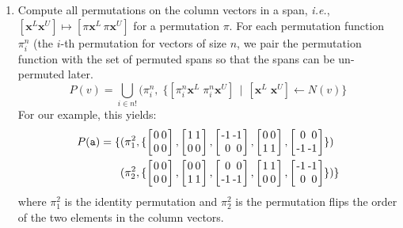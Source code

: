 \documentclass[9pt]{sigplanconf}
\theoremstyle{definition}
\newcommand{\ie}{\emph{i.e.}}
\newcommand{\vect}[1]{\textbf{#1}}
\newcommand{\vtwo}[2]{\setlength{\arraycolsep}{0em}
\left[\begin{array}{l}#1\\#2\end{array}\right]}
\newcommand{\stwo}[4]
{\setlength{\arraycolsep}{0.1em}
\left[\begin{array}{rr}$#1$ & $#3$\\$#2$ & $#4$\end{array}\right]}
\begin{document}
\begin{enumerate}

\item Compute all permutations on the column vectors in a span, \ie{},
  $[\vect{x}^L \vect{x}^U] \mapsto [\pi\vect{x}^L \, \pi\vect{x}^U]$
for a permutation $\pi$. For each permutation function $\pi^n_i$
(the $i$-th permutation for vectors of size $n$, we pair the
permutation function with the set of permuted spans so that
the spans can be un-permuted later.
%
\[
P(v) = \bigcup_{i \in n!} (\pi^n_{i} , \; \{[\pi^n_i
\vect{x}^L \; \pi^n_i\vect{x}^U] \, \mid \, [\vect{x}^L \; \vect{x}^U]
\leftarrow N(v)\}
\]
%
For our example, this yields:
%
\begin{align*}
P(\texttt{a}) =
\{&(\pi^2_1, \{ \stwo{0}{0}{0}{0},
\stwo{1}{0}{1}{0},
\stwo{-1}{0}{-1}{0},
\stwo{0}{1}{0}{1},
\stwo{0}{-1}{0}{-1} \})
\\
&(\pi^2_2, \{
 \stwo{0}{0}{0}{0},
 \stwo{0}{1}{0}{1},
 \stwo{0}{-1}{0}{-1},
 \stwo{1}{0}{1}{0},
 \stwo{-1}{0}{-1}{0}\})\}
\end{align*}
%
where $\pi^2_1$ is the identity permutation and $\pi^2_2$ is the
permutation flips the order of the two elements in the column
vectors.


\end{enumerate}
\end{document}
